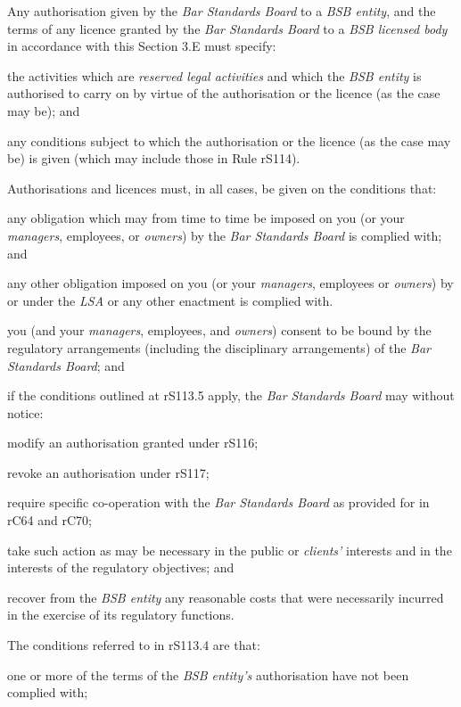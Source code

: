 
Any authorisation given by the \emph{Bar Standards Board} to a \emph{BSB
entity}, and the terms of any licence granted by the \emph{Bar Standards
Board} to a \emph{BSB licensed body} in accordance with this Section 3.E
must specify:\nl\item the activities which are \emph{reserved legal activities} and which
the \emph{BSB entity} is authorised to carry on by virtue of the
authorisation or the licence (as the case may be); and
\item any conditions subject to which the authorisation or the licence (as
the case may be) is given (which may include those in Rule rS114).
\ln
{}

Authorisations and licences must, in all cases, be given on the
conditions that:\nl\item any obligation which may from time to time be imposed on you (or your
\emph{managers}, employees, or \emph{owners}) by the \emph{Bar Standards
Board} is complied with; and
\item any other obligation imposed on you (or your \emph{managers},
employees or \emph{owners}) by or under the \emph{LSA} or any other
enactment is complied with.
\item you (and your \emph{managers}, employees, and \emph{owners}) consent
to be bound by the regulatory arrangements (including the disciplinary
arrangements) of the \emph{Bar Standards Board}; and
\item if the conditions outlined at rS113.5 apply, the \emph{Bar Standards
Board} may without notice:
\al
\item modify an authorisation granted under rS116;

\item revoke an authorisation under rS117;

\item require specific co-operation with the \emph{Bar Standards Board} as
provided for in rC64 and rC70;

\item take such action as may be necessary in the public or \emph{clients'}
interests and in the interests of the regulatory objectives; and

\item recover from the \emph{BSB entity} any reasonable costs that were
necessarily incurred in the exercise of its regulatory functions.\la
\item The conditions referred to in rS113.4 are that:
\al
\item one or more of the terms of the \emph{BSB entity's} authorisation
have not been complied with;

